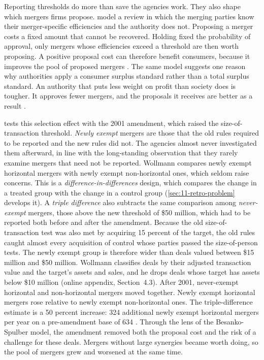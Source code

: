 Reporting thresholds do more than save the agencies work. They also shape which mergers firms propose.
\citet{BesankoSpulber1993} model a review in which the merging parties know their merger-specific efficiencies and
the authority does not. Proposing a merger costs a fixed amount that cannot be recovered. Holding fixed the
probability of approval, only mergers whose efficiencies exceed a threshold are then worth proposing. A positive
proposal cost can therefore benefit consumers, because it improves the pool of proposed mergers
\citep[p.~223]{AskerNocke2021}. The same model suggests one reason why authorities apply a consumer surplus
standard rather than a total surplus standard. An authority that puts less weight on profit than society does is
tougher. It approves fewer mergers, and the proposals it receives are better as a result \citep[p.~223,
n.~120]{AskerNocke2021}.

\citet{Wollmann2019} tests this selection effect with the 2001 amendment, which raised the size-of-transaction
threshold. \emph{Newly exempt} mergers are those that the old rules required to be reported and the new rules did
not. The agencies almost never investigated them afterward, in line with the long-standing observation that they
rarely examine mergers that need not be reported. Wollmann compares newly exempt horizontal mergers with newly
exempt non-horizontal ones, which seldom raise concerns. This is a \emph{difference-in-differences} design, which
compares the change in a treated group with the change in a control group (\cref{sec:11-retro-problem} develops it).
A \emph{triple difference} also subtracts the same comparison among \emph{never-exempt} mergers, those above the new
threshold of \$50 million, which had to be reported both before and after the amendment. Because the old
size-of-transaction test was also met by acquiring 15 percent of the target, the old rules caught almost every
acquisition of control whose parties passed the size-of-person tests. The newly exempt group is therefore wider than
deals valued between \$15 million and \$50 million. Wollmann classifies deals by their adjusted transaction value
and the target's assets and sales, and he drops deals whose target has assets below \$10 million (online appendix,
Section~4.3). After 2001, never-exempt horizontal and non-horizontal mergers moved together. Newly exempt horizontal mergers rose
relative to newly exempt non-horizontal ones. The triple-difference estimate is a 50 percent increase: 324
additional newly exempt horizontal mergers per year on a pre-amendment base of 634 \citep[pp.~224--226]{AskerNocke2021}.
Through the lens of the Besanko-Spulber model, the amendment removed both the proposal cost and the risk of a
challenge for these deals. Mergers without large synergies became worth doing, so the pool of mergers grew and
worsened at the same time.

